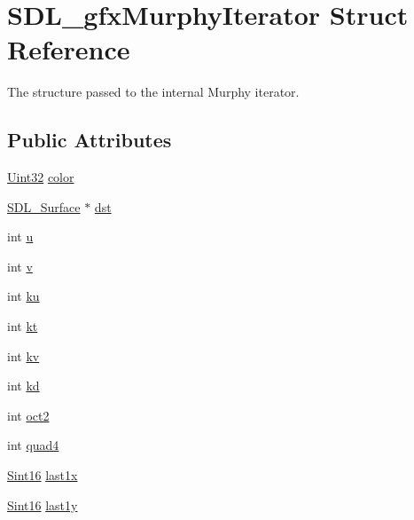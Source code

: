 \hypertarget{struct_s_d_l__gfx_murphy_iterator}{}\section{S\+D\+L\+\_\+gfx\+Murphy\+Iterator Struct Reference}
\label{struct_s_d_l__gfx_murphy_iterator}


The structure passed to the internal Murphy iterator.  


\subsection*{Public Attributes}
\begin{DoxyCompactItemize}
\item 
\hyperlink{_s_d_l__stdinc_8h_add440eff171ea5f55cb00c4a9ab8672d}{Uint32} \hyperlink{struct_s_d_l__gfx_murphy_iterator_add81cc0a301e921f0f48c163871c44db}{color}
\item 
\hyperlink{struct_s_d_l___surface}{S\+D\+L\+\_\+\+Surface} $\ast$ \hyperlink{struct_s_d_l__gfx_murphy_iterator_a25002bd39f0f0ec9d4d57f043fa52ab0}{dst}
\item 
int \hyperlink{struct_s_d_l__gfx_murphy_iterator_a596dd426d7ee2c607f652b67127222f1}{u}
\item 
int \hyperlink{struct_s_d_l__gfx_murphy_iterator_ad5f43f4ed3084be87718e052f6a0fe62}{v}
\item 
int \hyperlink{struct_s_d_l__gfx_murphy_iterator_aa65c5ae81743295d487bfc5881df042a}{ku}
\item 
int \hyperlink{struct_s_d_l__gfx_murphy_iterator_a179e1295e8dd96400439a35326311558}{kt}
\item 
int \hyperlink{struct_s_d_l__gfx_murphy_iterator_a04191da7cf85bbdf1d6b05460b942837}{kv}
\item 
int \hyperlink{struct_s_d_l__gfx_murphy_iterator_ab7214eb6e8449b51de00eb1b2e8127f8}{kd}
\item 
int \hyperlink{struct_s_d_l__gfx_murphy_iterator_a62768600f17a4ac8b713b03daab0630d}{oct2}
\item 
int \hyperlink{struct_s_d_l__gfx_murphy_iterator_ac24801d29079aaba495484e5e8293c7b}{quad4}
\item 
\hyperlink{_s_d_l__stdinc_8h_a9d0257032c0e146ab6121bf0122712f5}{Sint16} \hyperlink{struct_s_d_l__gfx_murphy_iterator_af055b4e2bb24717935fdbe77495d4737}{last1x}
\item 
\hyperlink{_s_d_l__stdinc_8h_a9d0257032c0e146ab6121bf0122712f5}{Sint16} \hyperlink{struct_s_d_l__gfx_murphy_iterator_ab84859cb70dc6db52d08128e4ebc7a93}{last1y}

\end{DoxyCompactItemize}

